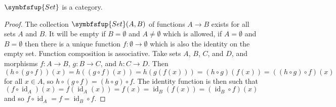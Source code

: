 \documentclass[fleqn]{NotesClass}
\makeatletter
\newcommand{\c@egory}[1]{\symbfsfup{#1}}
\newcommand{\Set}{\c@egory{Set}}
\DeclareMathOperator{\id}{id}
\makeatother
\begin{document}
    \begin{lma}{}{}
        \(\Set\) is a category.
        \begin{proof}
            The collection \(\Set(A, B)\) of functions \(A \to B\) exists for all sets \(A\) and \(B\).
            It will be empty if \(B = \emptyset\) and \(A \ne \emptyset\) which is allowed, if \(A = \emptyset\) and \(B = \emptyset\) then there is a unique function \(f \colon \emptyset \to \emptyset\) which is also the identity on the empty set.
            Function composition is associative.
            Take sets \(A\), \(B\), \(C\), and \(D\), and morphisms \(f \colon A \to B\), \(g \colon B \to C\), and \(h \colon C \to D\).
            Then
            \begin{equation}
                (h \circ (g \circ f))(x) = h((g \circ f)(x)) = h(g(f(x))) = (h \circ g)(f(x)) = ((h \circ g) \circ f)(x)
            \end{equation}
            for all \(x \in A\), so \(h \circ (g \circ f) = (h \circ g) \circ f\).
            The identity function is then such that
            \begin{equation}
                (f \circ \id_A)(x) = f(\id_A(x)) = f(x) = \id_B(f(x)) = (\id_B \circ f)(x)
            \end{equation}
            and so \(f \circ \id_A = f = \id_B \circ f\).
        \end{proof}
    \end{lma}
    
\end{document}
